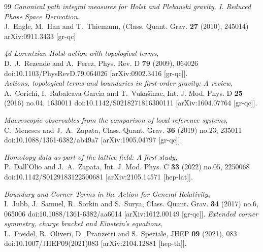 \documentclass{article}
\begin{document}
\begin{thebibliography}{99}
\emph{Canonical path integral measures for Holst and Plebanski gravity. I. Reduced Phase Space Derivation}.\\
J.~Engle, M.~Han and T.~Thiemann,
(Class. Quant. Grav. \textbf{27} (2010), 245014)
arXiv:0911.3433 [gr-qc]


\emph{4d Lorentzian Holst action with topological terms},\\
D.~J.~Rezende and A.~Perez,
Phys. Rev. D \textbf{79} (2009), 064026
doi:10.1103/PhysRevD.79.064026
[arXiv:0902.3416 [gr-qc]].\\
\emph{Actions, topological terms and boundaries in first-order gravity: A review},\\
A.~Corichi, I.~Rubalcava-Garc\'\i{}a and T.~Vuka\v{s}inac,
Int. J. Mod. Phys. D \textbf{25} (2016) no.04, 1630011
doi:10.1142/S0218271816300111
[arXiv:1604.07764 [gr-qc]].


\emph{Macroscopic observables from the comparison of local reference systems},\\
C.~Meneses and J.~A.~Zapata,
Class. Quant. Grav. \textbf{36} (2019) no.23, 235011
doi:10.1088/1361-6382/ab49a7
[arXiv:1905.04797 [gr-qc]].

\emph{Homotopy data as part of the lattice field: A first study},\\
P.~Dall'Olio and J.~A.~Zapata,
Int. J. Mod. Phys. C \textbf{33} (2022) no.05, 2250068
doi:10.1142/S0129183122500681
[arXiv:2105.14571 [hep-lat]].

\emph{Boundary and Corner Terms in the Action for General Relativity},\\
I.~Jubb, J.~Samuel, R.~Sorkin and S.~Surya,
Class. Quant. Grav. \textbf{34} (2017) no.6, 065006
doi:10.1088/1361-6382/aa6014
[arXiv:1612.00149 [gr-qc]].
\emph{Extended corner symmetry, charge bracket and Einstein\textquoteright{}s equations},\\
L.~Freidel, R.~Oliveri, D.~Pranzetti and S.~Speziale,
JHEP \textbf{09} (2021), 083
doi:10.1007/JHEP09(2021)083
[arXiv:2104.12881 [hep-th]].




\end{thebibliography}
\end{document}
